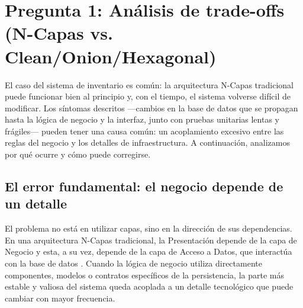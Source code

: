 \section[Pregunta 1: Análisis de trade-offs]{Pregunta 1: Análisis de trade-offs\\(N-Capas vs. Clean/Onion/Hexagonal)}


El caso del sistema de inventario es común: la arquitectura N-Capas tradicional puede funcionar bien al principio y, con el tiempo, el sistema volverse difícil de modificar. Los síntomas descritos —cambios en la base de datos que se propagan hasta la lógica de negocio y la interfaz, junto con pruebas unitarias lentas y frágiles— pueden tener una causa común: un acoplamiento excesivo entre las reglas del negocio y los detalles de infraestructura. A continuación, analizamos por qué ocurre y cómo puede corregirse.

\subsection{El error fundamental: el negocio depende de un detalle}

El problema no está en utilizar capas, sino en la dirección de sus dependencias. En una arquitectura N-Capas tradicional, la Presentación depende de la capa de Negocio y esta, a su vez, depende de la capa de Acceso a Datos, que interactúa con la base de datos \parencite{richards2015}. Cuando la lógica de negocio utiliza directamente componentes, modelos o contratos específicos de la persistencia, la parte más estable y valiosa del sistema queda acoplada a un detalle tecnológico que puede cambiar con mayor frecuencia.

